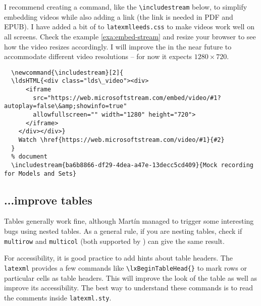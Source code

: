 \documentclass[a4paper]{article}
\def\ltxinline{\lstinline[style=latexml,frame=none]}
\theoremstyle{definition}
\begin{document}
I recommend creating a command, like the \ltxinline|\includestream| below, to simplify embedding videos while also adding a link (the link is needed in PDF and EPUB). I have added a bit of \CSS{} to \verb|latexmlleeds.css| to make videos work well on all screens. Check the example \autoref{exa:embed-stream} and resize your browser to see how the video resizes accordingly. I will improve the \CSS{} in the near future to accommodate different video resolutions -- for now it expects $1280 \times 720$.
\begin{lstlisting}[style=latexml]
  % preamble
  \newcommand{\includestream}[2]{
  \ldsHTML{<div class="lds\_video"><div>
      <iframe
        src="https://web.microsoftstream.com/embed/video/#1?autoplay=false\&amp;showinfo=true"
        allowfullscreen="" width="1280" height="720">
      </iframe>
    </div></div>}
    Watch \href{https://web.microsoftstream.com/video/#1}{#2}
  }
  % document
  \includestream{ba6b8866-df29-4dea-a47e-13decc5cd409}{Mock recording for Models and Sets}
\end{lstlisting}

\subsection{...improve tables}
Tables generally work fine, although Mart\'in managed to trigger some interesting bugs using nested tables. As a general rule, if you are nesting tables, check if \verb|multirow| and \verb|multicol| (both supported by \LaTeXML{}) can give the same result.

  For accessibility, it is good practice to add hints about table headers. The \verb|latexml| provides a few commands like \ltxinline|\lxBeginTableHead{}| to mark rows or particular cells as table headers. This will improve the look of the \HTML{} table as well as improve its accessibility. The best way to understand these commands is to read the comments inside \verb|latexml.sty|.
\end{document}
